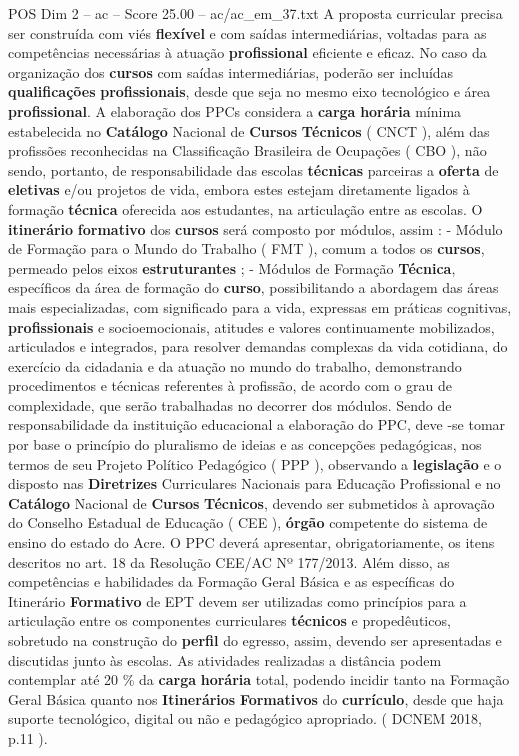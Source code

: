 \begin{textsample}{POS Dim 2 – ac – Score 25.00 – ac/ac\_em\_37.txt}
A proposta curricular precisa ser construída com viés \textbf{flexível} e com saídas intermediárias, voltadas para as competências necessárias à atuação \textbf{profissional} eficiente e eficaz.
No caso da organização dos \textbf{cursos} com saídas intermediárias, poderão ser incluídas \textbf{qualificações} \textbf{profissionais}, desde que seja no mesmo eixo tecnológico e área \textbf{profissional}.
A elaboração dos PPCs considera a \textbf{carga} \textbf{horária} mínima estabelecida no \textbf{Catálogo} Nacional de \textbf{Cursos} \textbf{Técnicos} ( CNCT ), além das profissões reconhecidas na Classificação Brasileira de Ocupações ( CBO ), não sendo, portanto, de responsabilidade das escolas \textbf{técnicas} parceiras a \textbf{oferta} de \textbf{eletivas} e/ou projetos de vida, embora estes estejam diretamente ligados à formação \textbf{técnica} oferecida aos estudantes, na articulação entre as escolas.
O \textbf{itinerário} \textbf{formativo} dos \textbf{cursos} será composto por módulos, assim : - Módulo de Formação para o Mundo do Trabalho ( FMT ), comum a todos os \textbf{cursos}, permeado pelos eixos \textbf{estruturantes} ; - Módulos de Formação \textbf{Técnica}, específicos da área de formação do \textbf{curso}, possibilitando a abordagem das áreas mais especializadas, com significado para a vida, expressas em práticas cognitivas, \textbf{profissionais} e socioemocionais, atitudes e valores continuamente mobilizados, articulados e integrados, para resolver demandas complexas da vida cotidiana, do exercício da cidadania e da atuação no mundo do trabalho, demonstrando procedimentos e técnicas referentes à profissão, de acordo com o grau de complexidade, que serão trabalhadas no decorrer dos módulos.
Sendo de responsabilidade da instituição educacional a elaboração do PPC, deve -se tomar por base o princípio do pluralismo de ideias e as concepções pedagógicas, nos termos de seu Projeto Político Pedagógico ( PPP ), observando a \textbf{legislação} e o disposto nas \textbf{Diretrizes} Curriculares Nacionais para Educação Profissional e no \textbf{Catálogo} Nacional de \textbf{Cursos} \textbf{Técnicos}, devendo ser submetidos à aprovação do Conselho Estadual de Educação ( CEE ), \textbf{órgão} competente do sistema de ensino do estado do Acre.
O PPC deverá apresentar, obrigatoriamente, os itens descritos no art. 18 da Resolução CEE/AC Nº 177/2013.
Além disso, as competências e habilidades da Formação Geral Básica e as específicas do Itinerário \textbf{Formativo} de EPT devem ser utilizadas como princípios para a articulação entre os componentes curriculares \textbf{técnicos} e propedêuticos, sobretudo na construção do \textbf{perfil} do egresso, assim, devendo ser apresentadas e discutidas junto às escolas.
As atividades realizadas a distância podem contemplar até 20 \% da \textbf{carga} \textbf{horária} total, podendo incidir tanto na Formação Geral Básica quanto nos \textbf{Itinerários} \textbf{Formativos} do \textbf{currículo}, desde que haja suporte tecnológico, digital ou não e pedagógico apropriado. ( DCNEM 2018, p.11 ).


\end{textsample}
